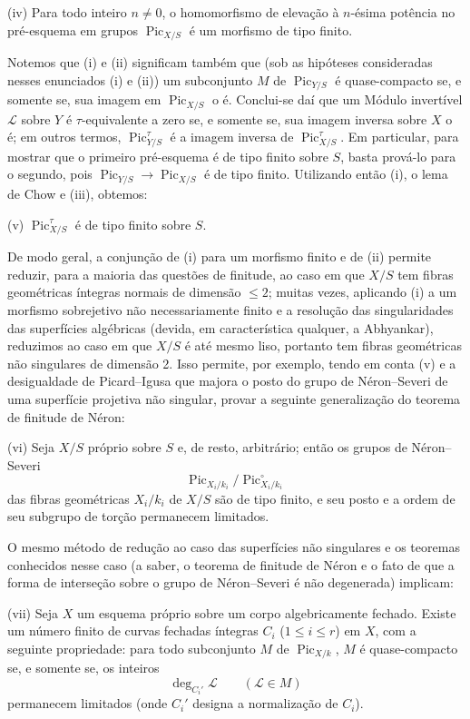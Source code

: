 \noindent(iv) Para todo inteiro $n\neq0$, o homomorfismo de elevação à
$n$-ésima potência no pré-esquema em grupos $\operatorname{Pic}_{X/S}$ é um
morfismo de tipo finito.

Notemos que (i) e (ii) significam também que (sob as hipóteses consideradas
nesses enunciados (i) e (ii)) um subconjunto $M$ de
$\operatorname{Pic}_{Y/S}$ é quase-compacto se, e somente se, sua imagem em
$\operatorname{Pic}_{X/S}$ o é. Conclui-se daí que um Módulo invertível
$\mathcal L$ sobre $Y$ é $\tau$-equivalente a zero se, e somente se, sua imagem
inversa sobre $X$ o é; em outros termos, $\operatorname{Pic}_{Y/S}^\tau$ é a
imagem inversa de $\operatorname{Pic}_{X/S}^\tau$. Em particular, para mostrar
que o primeiro pré-esquema é de tipo finito sobre $S$, basta prová-lo para o
segundo, pois $\operatorname{Pic}_{Y/S}\longrightarrow
\operatorname{Pic}_{X/S}$ é de tipo finito. Utilizando então (i), o lema de
Chow e (iii), obtemos:

\medskip
\noindent(v) $\operatorname{Pic}_{X/S}^\tau$ é de tipo finito sobre $S$.

De modo geral, a conjunção de (i) para um morfismo finito e de (ii) permite
reduzir, para a maioria das questões de finitude, ao caso em que $X/S$ tem
fibras geométricas íntegras normais de dimensão $\leq2$; muitas vezes, aplicando
(i) a um morfismo sobrejetivo não necessariamente finito e a resolução das
singularidades das superfícies algébricas (devida, em característica qualquer,
a Abhyankar), reduzimos ao caso em que $X/S$ é até mesmo liso, portanto tem
fibras geométricas não singulares de dimensão 2. Isso permite, por exemplo,
tendo em conta (v) e a desigualdade de Picard--Igusa que majora o posto do grupo
de Néron--Severi de uma superfície projetiva não singular, provar a seguinte
generalização do teorema de finitude de Néron:

\medskip
\noindent(vi) Seja $X/S$ próprio sobre $S$ e, de resto, arbitrário; então os
grupos de Néron--Severi
\[
\operatorname{Pic}_{X_i/k_i}/\operatorname{Pic}_{X_i/k_i}^\circ
\]
das fibras geométricas $X_i/k_i$ de $X/S$
são de tipo finito, e seu posto e a ordem de seu subgrupo de torção permanecem
limitados.

O mesmo método de redução ao caso das superfícies não singulares e os teoremas
conhecidos nesse caso (a saber, o teorema de finitude de Néron e o fato de que a
forma de interseção sobre o grupo de Néron--Severi é não degenerada) implicam:

\medskip
\noindent(vii) Seja $X$ um esquema próprio sobre um corpo algebricamente
fechado. Existe um número finito de curvas fechadas íntegras $C_i$
($1\leq i\leq r$) em $X$, com a seguinte propriedade: para todo subconjunto
$M$ de $\operatorname{Pic}_{X/k}$, $M$ é quase-compacto se, e somente se, os
inteiros
\[
\deg_{C_i'}\mathcal L\qquad(\mathcal L\in M)
\]
permanecem limitados (onde $C_i'$ designa a normalização de $C_i$).

